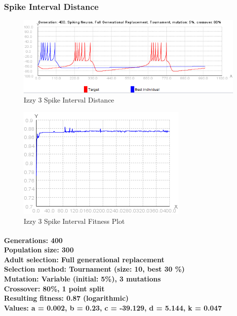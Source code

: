 \documentclass[titlepage,norsk]{article}
\begin{document}
\subsubsection{Spike Interval Distance}

\begin{figure}[h!]
\centering
\includegraphics[scale=0.75]{izzy3interval.png}
\caption{Izzy 3 Spike Interval Distance}
\label{fig:awesome_image}
\end{figure}

\begin{figure}[h!]
\centering
\includegraphics[scale=0.75]{izzy3intervalFitness.png}
\caption{Izzy 3 Spike Interval Fitness Plot}
\label{fig:awesome_image}
\end{figure}

\paragraph{
Generations: 400\\
Population size: 300\\
Adult selection: Full generational replacement \\
Selection method: Tournament (size: 10, best 30 \%) \\
Mutation:  Variable (initial: 5\%), 3 mutations \\
Crossover: 80\%, 1 point split \\
Resulting fitness: 0.87 (logarithmic) \\
Values: a = 0.002, b = 0.23, c = -39.129, d = 5.144, k = 0.047 \\
}
\end{document}
